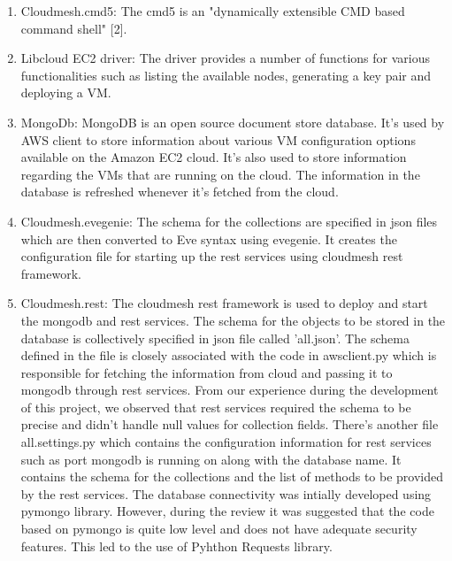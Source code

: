 \documentclass[9pt,twocolumn,twoside]{../../styles/osajnl}
\begin{document}
\begin{enumerate}

\item Cloudmesh.cmd5: The cmd5 is an "dynamically extensible CMD based
  command shell" [2].

\item Libcloud EC2 driver: The driver provides a number of functions
  for various functionalities such as listing the available nodes,
  generating a key pair and deploying a VM.

\item MongoDb: MongoDB is an open source document store database. It's
  used by AWS client to store information about various VM
  configuration options available on the Amazon EC2 cloud. It's also
  used to store information regarding the VMs that are running on the
  cloud. The information in the database is refreshed whenever it's
  fetched from the cloud.

\item Cloudmesh.evegenie: The schema for the collections are specified
  in json files which are then converted to Eve syntax using
  evegenie. It creates the configuration file for starting up the rest
  services using cloudmesh rest framework.
	 	
\item Cloudmesh.rest: The cloudmesh rest framework is used to deploy
  and start the mongodb and rest services. The schema for the objects
  to be stored in the database is collectively specified in json file
  called 'all.json'. The schema defined in the file is closely
  associated with the code in awsclient.py which is responsible for
  fetching the information from cloud and passing it to mongodb
  through rest services. From our experience during the development of
  this project, we observed that rest services required the schema to
  be precise and didn't handle null values for collection
  fields. There's another file all.settings.py which contains the
  configuration information for rest services such as port mongodb is
  running on along with the database name. It contains the schema for
  the collections and the list of methods to be provided by the rest
  services. The database connectivity was intially developed using
  pymongo library. However, during the review it was suggested that
  the code based on pymongo is quite low level and does not have
  adequate security features. This led to the use of Pyhthon Requests
  library.
	
\end{enumerate}
\end{document}
